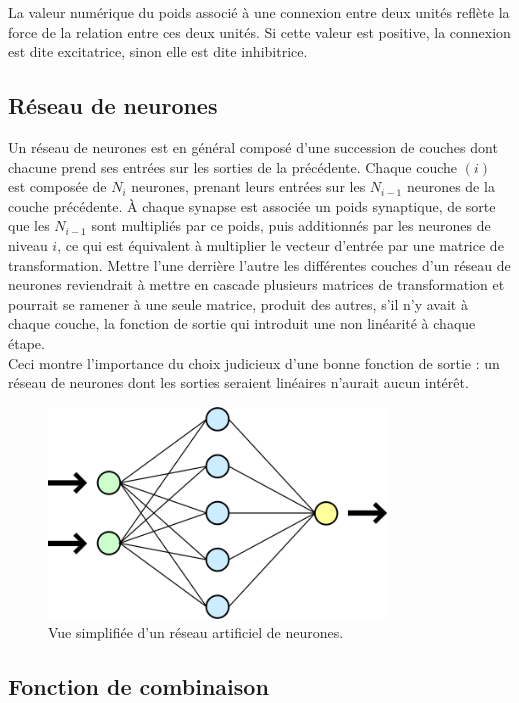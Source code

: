 La valeur numérique du poids associé à une connexion entre deux unités reflète la force de la relation entre ces deux unités. Si cette valeur est positive, la connexion est dite excitatrice, sinon elle est dite inhibitrice.


\subsection{Réseau de neurones}

Un réseau de neurones est en général composé d'une succession de couches dont chacune prend ses entrées sur les sorties de la précédente. Chaque couche $(i)$ est composée de $N_{i}$ neurones, prenant leurs entrées sur les $N_{i-1}$ neurones de la couche précédente. À chaque synapse est associée un poids synaptique, de sorte que les $N_{i-1}$ sont multipliés par ce poids, puis additionnés par les neurones de niveau $i$, ce qui est équivalent à multiplier le vecteur d'entrée par une matrice de transformation. Mettre l'une derrière l'autre les différentes couches d'un réseau de neurones reviendrait à mettre en cascade plusieurs matrices de transformation et pourrait se ramener à une seule matrice, produit des autres, s'il n'y avait à chaque couche, la fonction de sortie qui introduit une non linéarité à chaque étape.\\
Ceci montre l'importance du choix judicieux d'une bonne fonction de sortie : un réseau de neurones dont les sorties seraient linéaires n'aurait aucun intérêt.

\begin{figure}[H]
    \centering
    \includegraphics[width=0.8\textwidth]{./pictures/800px-Neural_network.png}
    \caption{Vue simplifiée d'un réseau artificiel de neurones.}
\end{figure}

\subsection{Fonction de combinaison}

